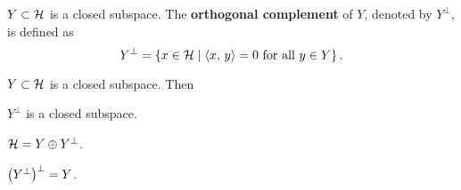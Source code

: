 \begin{definition}
    $Y\subset\mathcal{H}$ is a closed subspace. The \textbf{orthogonal complement} of 
    $Y$, denoted by $Y^\perp$, is defined as 
    \begin{equation*}
        Y^\perp = \left\{ x\in\mathcal{H} \;\middle\vert\; \left\langle {x},\, {y} \right\rangle = 0\text{ for all }y\in Y \right\}.
    \end{equation*}
\end{definition}

\begin{proposition}\label{prop:orthogonal_complement}
    $Y\subset\mathcal{H}$ is a closed subspace. Then 
    \begin{thmenum}
        \item $Y^\perp$ is a closed subspace. 
        \item $\mathcal{H} = Y\oplus Y^\perp$.
        \item $\pth{Y^\perp}^\perp = Y$.
    \end{thmenum}
\end{proposition}
